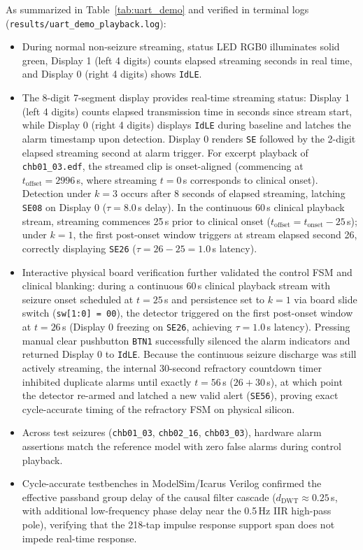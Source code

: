 \documentclass[10pt,twocolumn,letterpaper]{article}
\begin{document}
{As summarized in Table~\ref{tab:uart_demo} and verified in terminal logs (\texttt{results/uart\_demo\_playback.log}):
\begin{itemize}
    \item During normal non-seizure streaming, status LED RGB0 illuminates solid green, Display 1 (left 4 digits) counts elapsed streaming seconds in real time, and Display 0 (right 4 digits) shows \texttt{IdLE}.
    \item The 8-digit 7-segment display provides real-time streaming status: Display 1 (left 4 digits) counts elapsed transmission time in seconds since stream start, while Display 0 (right 4 digits) displays \texttt{IdLE} during baseline and latches the alarm timestamp upon detection. Display 0 renders \texttt{SE} followed by the 2-digit elapsed streaming second at alarm trigger. For excerpt playback of \texttt{chb01\_03.edf}, the streamed clip is onset-aligned (commencing at $t_{\text{offset}} = 2996$\,s, where streaming $t=0$\,s corresponds to clinical onset). Detection under $k=3$ occurs after 8 seconds of elapsed streaming, latching \texttt{SE08} on Display 0 ($\tau = 8.0$\,s delay). In the continuous 60\,s clinical playback stream, streaming commences 25\,s prior to clinical onset ($t_{\text{offset}} = t_{\text{onset}} - 25$\,s); under $k=1$, the first post-onset window triggers at stream elapsed second 26, correctly displaying \texttt{SE26} ($\tau = 26 - 25 = 1.0$\,s latency).
    \item Interactive physical board verification further validated the control FSM and clinical blanking: during a continuous 60\,s clinical playback stream with seizure onset scheduled at $t = 25$\,s and persistence set to $k=1$ via board slide switch (\texttt{sw[1:0] = 00}), the detector triggered on the first post-onset window at $t = 26$\,s (Display 0 freezing on \texttt{SE26}, achieving $\tau = 1.0$\,s latency). Pressing manual clear pushbutton \texttt{BTN1} successfully silenced the alarm indicators and returned Display 0 to \texttt{IdLE}. Because the continuous seizure discharge was still actively streaming, the internal 30-second refractory countdown timer inhibited duplicate alarms until exactly $t = 56$\,s ($26 + 30$\,s), at which point the detector re-armed and latched a new valid alert (\texttt{SE56}), proving exact cycle-accurate timing of the refractory FSM on physical silicon.
    \item Across test seizures (\texttt{chb01\_03}, \texttt{chb02\_16}, \texttt{chb03\_03}), hardware alarm assertions match the reference model with zero false alarms during control playback.
    \item Cycle-accurate testbenches in ModelSim/Icarus Verilog confirmed the effective passband group delay of the causal filter cascade ($d_{\text{DWT}} \approx 0.25$\,s, with additional low-frequency phase delay near the 0.5\,Hz IIR high-pass pole), verifying that the 218-tap impulse response support span does not impede real-time response.
\end{itemize}

}
\end{document}
